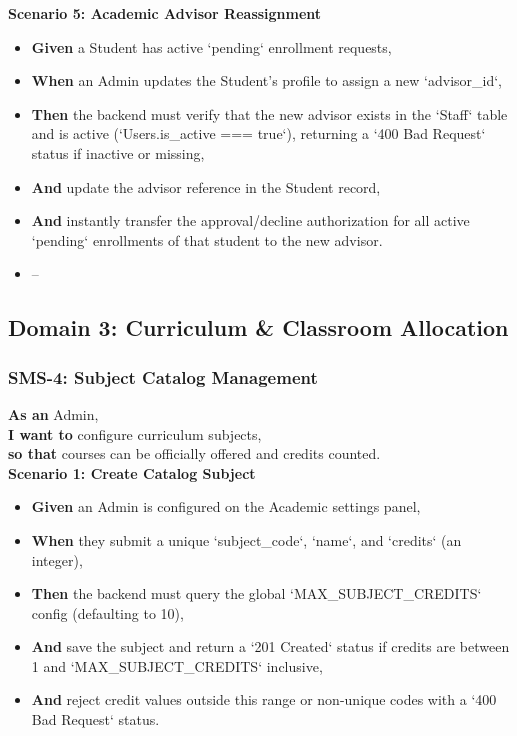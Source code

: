 \noindent\textbf{Scenario 5: Academic Advisor Reassignment}\\
\begin{itemize}
  \item \textbf{Given} a Student has active `pending` enrollment requests,
  \item \textbf{When} an Admin updates the Student's profile to assign a new `advisor\_id`,
  \item \textbf{Then} the backend must verify that the new advisor exists in the `Staff` table and is active (`Users.is\_active === true`), returning a `400 Bad Request` status if inactive or missing,
  \item \textbf{And} update the advisor reference in the Student record,
  \item \textbf{And} instantly transfer the approval/decline authorization for all active `pending` enrollments of that student to the new advisor.
\end{itemize}

\begin{itemize}
  \item --
\end{itemize}

\subsection{Domain 3: Curriculum \& Classroom Allocation}

\subsubsection{SMS-4: Subject Catalog Management}
\noindent \textbf{As an} Admin, \\
\noindent \textbf{I want to} configure curriculum subjects, \\
\noindent \textbf{so that} courses can be officially offered and credits counted. \\



\noindent\textbf{Scenario 1: Create Catalog Subject}\\
\begin{itemize}
  \item \textbf{Given} an Admin is configured on the Academic settings panel,
  \item \textbf{When} they submit a unique `subject\_code`, `name`, and `credits` (an integer),
  \item \textbf{Then} the backend must query the global `MAX\_SUBJECT\_CREDITS` config (defaulting to 10),
  \item \textbf{And} save the subject and return a `201 Created` status if credits are between 1 and `MAX\_SUBJECT\_CREDITS` inclusive,
  \item \textbf{And} reject credit values outside this range or non-unique codes with a `400 Bad Request` status.
\end{itemize}



